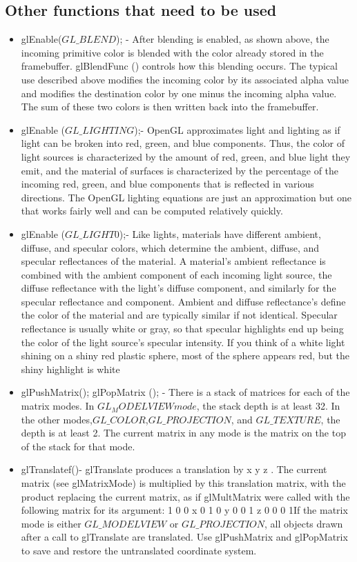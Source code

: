 \documentclass[letterpaper, 10 pt, conference]{ieeeconf}  %
\begin{document}
\subsection{Other functions that need to be used}

\begin{itemize}
\item  glEnable($ GL\_BLEND $); - After blending is enabled, as shown above, the incoming primitive color is blended with the color already stored in the framebuffer. glBlendFunc () controls how this blending occurs. The typical use described above modifies the incoming color by its associated alpha value and modifies the destination color by one minus the incoming alpha value. The sum of these two colors is then written back into the framebuffer.
\item  glEnable ($ GL\_LIGHTING $);- OpenGL approximates light and lighting as if light can be broken into red, green, and blue components. Thus, the color of light sources is characterized by the amount of red, green, and blue light they emit, and the material of surfaces is characterized by the percentage of the incoming red, green, and blue components that is reflected in various directions. The OpenGL lighting equations are just an approximation but one that works fairly well and can be computed relatively quickly.
\item glEnable ($ GL\_LIGHT0 $);- Like lights, materials have different ambient, diffuse, and specular colors, which determine the ambient, diffuse, and specular reflectances of the material. A material's ambient reflectance is combined with the ambient component of each incoming light source, the diffuse reflectance with the light's diffuse component, and similarly for the specular reflectance and component. Ambient and diffuse reflectance’s define the color of the material and are typically similar if not identical. Specular reflectance is usually white or gray, so that specular highlights end up being the color of the light source's specular intensity. If you think of a white light shining on a shiny red plastic sphere, most of the sphere appears red, but the shiny highlight is white
\item glPushMatrix($ $); glPopMatrix (); - There is a stack of matrices for each of the matrix modes. In $ GL_MODELVIEWmode $, the stack depth is at least 32. In the other modes,$GL\_COLOR$,$GL\_PROJECTION$, and $GL\_TEXTURE$, the depth is at least 2. The current matrix in any mode is the matrix on the top of the stack for that mode.
\item glTranslatef($ $)- glTranslate produces a translation by x y z . The current matrix (see glMatrixMode) is multiplied by this translation matrix, with the product replacing the current matrix, as if glMultMatrix were called with the following matrix for its argument:  1 0 0 x 0 1 0 y 0 0 1 z 0 0 0 1If the matrix mode is either $GL\_MODELVIEW$ or $GL\_PROJECTION$, all objects drawn after a call to glTranslate are translated. Use  glPushMatrix and glPopMatrix to save and restore the untranslated coordinate system.

\end{itemize}
\end{document}
